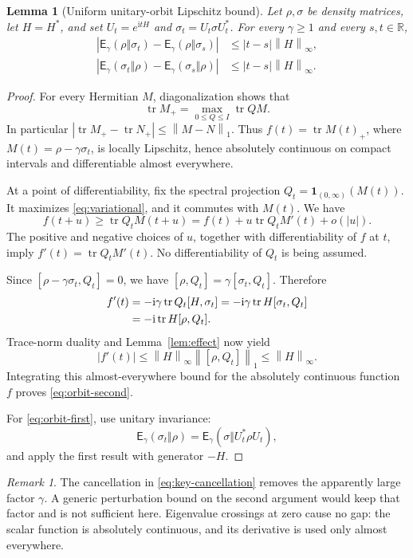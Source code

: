 \documentclass[11pt]{article}
\numberwithin{equation}{section}
\newtheorem{lemma}[theorem]{Lemma}
\theoremstyle{remark}
\newtheorem{remark}[theorem]{Remark}
\DeclareMathOperator{\tr}{tr}
\newcommand{\Id}{I}
\newcommand{\one}[1]{\left\lVert #1\right\rVert_1}
\newcommand{\op}[1]{\left\lVert #1\right\rVert_\infty}
\newcommand{\hs}{\mathsf E}
\newcommand{\ii}{\mathrm i}
\begin{document}
\begin{lemma}[Uniform unitary-orbit Lipschitz bound]
\label{lem:unitary}
Let $\rho,\sigma$ be density matrices, let $H=H^*$, and set
$U_t=e^{\ii tH}$ and $\sigma_t=U_t\sigma U_t^*$. For every $\gamma\ge1$
and every $s,t\in\mathbb R$,
\begin{align}
 |\hs_\gamma(\rho\Vert\sigma_t)
    -\hs_\gamma(\rho\Vert\sigma_s)|
     &\le |t-s|\op{H},\label{eq:orbit-second}\\
 |\hs_\gamma(\sigma_t\Vert\rho)
    -\hs_\gamma(\sigma_s\Vert\rho)|
     &\le |t-s|\op{H}.\label{eq:orbit-first}
\end{align}
\end{lemma}
\begin{proof}
For every Hermitian $M$, diagonalization shows that
\begin{equation}
 \tr M_+=\max_{0\le Q\le\Id}\tr QM.
 \label{eq:variational}
\end{equation}
In particular $|\tr M_+-\tr N_+|\le\one{M-N}$. Thus
$f(t)=\tr M(t)_+$, where $M(t)=\rho-\gamma\sigma_t$, is locally
Lipschitz, hence absolutely continuous on compact intervals and
differentiable almost everywhere.

At a point of differentiability, fix the spectral projection
$Q_t=\boldsymbol 1_{(0,\infty)}(M(t))$. It maximizes
\eqref{eq:variational}, and it commutes with $M(t)$. We have
\[
 f(t+u)\ge\tr Q_tM(t+u)
       =f(t)+u\tr Q_tM'(t)+o(|u|).
\]
The positive and negative choices of $u$, together with differentiability
of $f$ at $t$, imply
$f'(t)=\tr Q_tM'(t)$. No differentiability of $Q_t$ is being assumed.

Since $[\rho-\gamma\sigma_t,Q_t]=0$, we have
$[\rho,Q_t]=\gamma[\sigma_t,Q_t]$. Therefore
\begin{align}
 f'(t)
  &=-\ii\gamma\tr Q_t[H,\sigma_t]
    =-\ii\gamma\tr H[\sigma_t,Q_t]\notag\\
  &=-\ii\tr H[\rho,Q_t].\label{eq:key-cancellation}
\end{align}
Trace-norm duality and Lemma~\ref{lem:effect} now yield
\[
 |f'(t)|\le\op{H}\one{[\rho,Q_t]}\le\op{H}.
\]
Integrating this almost-everywhere bound for the absolutely continuous
function $f$ proves \eqref{eq:orbit-second}.

For \eqref{eq:orbit-first}, use unitary invariance:
\[
 \hs_\gamma(\sigma_t\Vert\rho)
   =\hs_\gamma(\sigma\Vert U_t^*\rho U_t),
\]
and apply the first result with generator $-H$.
\end{proof}

\begin{remark}
The cancellation in \eqref{eq:key-cancellation} removes the apparently
large factor $\gamma$. A generic perturbation bound on the second
argument would keep that factor and is not sufficient here. Eigenvalue
crossings at zero cause no gap: the scalar function is absolutely
continuous, and its derivative is used only almost everywhere.
\end{remark}
\end{document}
